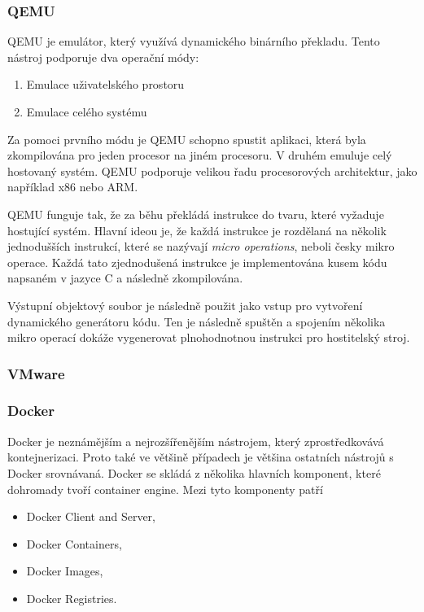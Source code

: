 \subsubsection{QEMU}
QEMU je emulátor, který využívá dynamického binárního překladu. Tento nástroj podporuje dva operační módy:

\begin{enumerate}
    \item Emulace uživatelského prostoru
    \item Emulace celého systému
\end{enumerate}

Za pomoci prvního módu je QEMU schopno spustit aplikaci, která byla zkompilována pro jeden procesor na jiném procesoru. V druhém emuluje celý hostovaný systém. QEMU podporuje velikou řadu procesorových architektur, jako například x86 nebo ARM. 

QEMU funguje tak, že za běhu překládá instrukce do tvaru, které vyžaduje hostující systém. Hlavní ideou je, že každá instrukce je rozdělaná na několik jednodušších instrukcí, které se nazývají \textit{micro operations}, neboli česky mikro operace. Každá tato zjednodušená instrukce je implementována kusem kódu napsaném v jazyce C a následně zkompilována. 

Výstupní objektový soubor je následně použit jako vstup pro vytvoření dynamického generátoru kódu. Ten je následně spuštěn a spojením několika mikro operací dokáže vygenerovat plnohodnotnou instrukci pro hostitelský stroj.\cite{chiueh2005survey}\cite{bellard2005qemu}


\subsubsection{VMware}




\subsubsection{Docker} 
Docker je neznámějším a nejrozšířenějším nástrojem, který zprostředkovává kontejnerizaci. Proto také ve většině případech je většina ostatních nástrojů s Docker srovnávaná. Docker se skládá z několika hlavních komponent, které dohromady tvoří container engine. Mezi tyto komponenty patří

\begin{itemize}
    \item Docker Client and Server,
    \item Docker Containers,
    \item Docker Images,
    \item Docker Registries.
\end{itemize}

